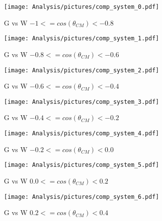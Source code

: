 \begin{figure}[htb]
  \begin{center}
    \texttt{[image: Analysis/pictures/comp\_system\_0.pdf]} \\
    \caption{G vs W $ -1 <= cos(\theta_{CM})<-0.8$}
    \label{fig:GvsW_theta1}
  \end{center}
\end{figure}
\begin{figure}[htb]
  \begin{center}
    \texttt{[image: Analysis/pictures/comp\_system\_1.pdf]} \\
    \caption{G vs W $ -0.8 <= cos(\theta_{CM})<-0.6$ }
    \label{fig:GvsW_theta2}
  \end{center}
\end{figure}
\begin{figure}[htb]
  \begin{center}
    \texttt{[image: Analysis/pictures/comp\_system\_2.pdf]} \\
    \caption{G vs W $ -0.6 <= cos(\theta_{CM})<-0.4$ }
    \label{fig:GvsW_theta3}
  \end{center}
\end{figure}
\begin{figure}[htb]
  \begin{center}
    \texttt{[image: Analysis/pictures/comp\_system\_3.pdf]} \\
    \caption{G vs W $ -0.4 <= cos(\theta_{CM})<-0.2$ }
    \label{fig:GvsW_theta4}
  \end{center}
\end{figure}
\begin{figure}[htb]
  \begin{center}
    \texttt{[image: Analysis/pictures/comp\_system\_4.pdf]} \\
    \caption{G vs W $ -0.2 <= cos(\theta_{CM})<0.0$ }
    \label{fig:GvsW_theta5}
  \end{center}
\end{figure}
\begin{figure}[htb]
  \begin{center}
    \texttt{[image: Analysis/pictures/comp\_system\_5.pdf]} \\
    \caption{G vs W $ 0.0 <= cos(\theta_{CM})<0.2$}
    \label{fig:GvsW_theta6}
  \end{center}
\end{figure}
\begin{figure}[htb]
  \begin{center}
    \texttt{[image: Analysis/pictures/comp\_system\_6.pdf]} \\
    \caption{G vs W $ 0.2 <= cos(\theta_{CM})<0.4$ }
    \label{fig:GvsW_theta7}
  \end{center}
\end{figure}
